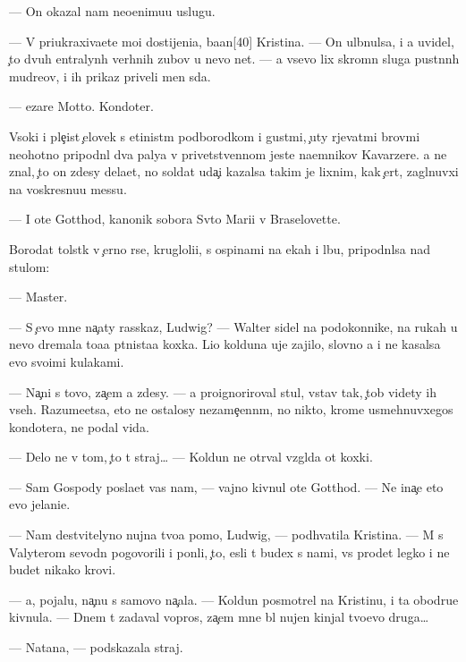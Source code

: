 \documentclass[10pt]{book}
\begin{document}
— On okazal nam neo{\q}enimu{\y}u uslugu.

— V{\yi} priukraxiva{\y}ete mo{\y}i dostijeni{\y}a, ba{\y}an[40] Kristina. — On ul{\yi}bnulsa, i {\y}a uvidel, {\c}to dvuh {\q}entralyn{\yi}h verhnih zubov u nevo net. — {\Y}a vsevo lix skromn{\yi}{\y} sluga pust{\yi}nn{\yi}h mudre{\q}ov, i ih prikaz{\yi} priveli men{\ia} s{\iu}da.

— {\C}ezare Motto. Kondot{\y}er.

V{\yi}soki{\y} i ple{\c}ist{\yi}{\y} {\c}elovek s {\x}etinist{\yi}m podborodkom i gust{\yi}mi, {\c}uty r{\yi}jevat{\yi}mi brov{\ia}mi neohotno pripodn{\ia}l dva paly{\q}a v privetstvennom jeste na{\y}emnikov Kavarzere. {\Y}a ne znal, {\c}to on zdesy dela{\y}et, no soldat uda{\c}i kazalsa takim je lixnim, kak {\c}ert, zagl{\ia}nuvxi{\y} na voskresnu{\y}u messu.

— I ote{\q} Gotthod, kanonik sobora Sv{\ia}to{\y} Mari{\y}i v Braselovette.

Borodat{\yi}{\y} tolst{\ia}k v {\c}erno{\y} r{\ia}se, krugloli{\q}i{\y}, s ospinami na {\x}ekah i lbu, pripodn{\ia}lsa nad stulom:

— Master.

— S {\c}evo mne na{\c}aty rasskaz, Ludwig? — Walter sidel na podokonnike, na rukah u nevo dremala to{\x}a{\y}a p{\ia}tnista{\y}a koxka. Li{\q}o kolduna uje zajilo, slovno {\y}a i ne kasalsa {\y}evo svo{\y}imi kulakami.

— Na{\c}ni s tovo, za{\c}em {\y}a zdesy. — {\Y}a proignoriroval stul, vstav tak, {\c}tob{\yi} videty ih vseh. Razume{\y}etsa, eto ne ostalosy nezame{\c}enn{\yi}m, no nikto, krome usmehnuvxegos{\ia} kondot{\y}era, ne podal vida.

— Delo ne v tom, {\c}to t{\yi} straj… — Koldun ne otr{\yi}val vzgl{\ia}da ot koxki.

— Sam Gospody pos{\yi}la{\y}et vas nam, — vajno kivnul ote{\q} Gotthod. — Ne ina{\c}e eto {\y}evo jelani{\y}e.

— Nam de{\y}stvitelyno nujna tvo{\y}a pomo{\x}, Ludwig, — podhvatila Kristina. — M{\yi} s Valyterom sevodn{\ia} pogovorili i pon{\ia}li, {\c}to, {\y}esli t{\yi} budex s nami, vs{\e} pro{\y}det legko i ne budet nikako{\y} krovi.

— {\Y}a, pojalu{\y}, na{\c}nu s samovo na{\c}ala. — Koldun posmotrel na Kristinu, i ta obodr{\ia}{\y}u{\x}e kivnula. — Dnem t{\yi} zadaval vopros, za{\c}em mne b{\yi}l nujen kinjal tvo{\y}evo druga…

— Natana, — podskazala straj.
\end{document}
